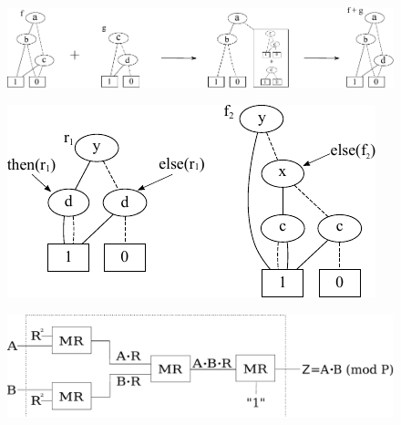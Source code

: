 \documentclass[journal, onecolumn]{IEEEtran}
\begin{document}
\clearpage

\begin{figure}[p]
\centering
\includegraphics[scale=1]{../figures/mod2sumfig_new_1.pdf}
\caption{}
\label{mod2sumfig}
\end{figure}

\clearpage

\begin{figure}[p]
\centering
\includegraphics[scale=1]{../figures/r1_f2.pdf}
\caption{}
\label{f2}
\end{figure}

\clearpage

\begin{figure}[p]
\centering
\includegraphics[scale=0.34]{../figures/new_mmcircuit.pdf}
\caption{}
\label{montfig}
\end{figure}

\clearpage
\end{document}

